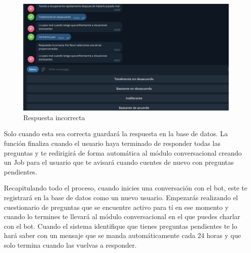 \begin{figure}[!ht]
    \centering
    \includegraphics[width=1\textwidth]{imagenes/pregunta_incorrecta.png}
    \caption{ Respuesta incorrecta }
    \label{fig:enter-label}
\end{figure}\vspace{0.3cm}

Solo cuando esta sea correcta guardará la respuesta en la base de datos. La función finaliza cuando el usuario haya terminado de responder todas las preguntas y te redirigirá de forma automática al módulo conversacional creando un Job para el usuario que te avisará cuando cuentes de nuevo con preguntas pendientes. \vspace{1cm}


Recapitulando todo el proceso, cuando inicies una conversación con el bot, este te registrará en la base de datos como un nuevo usuario. Empezarás realizando el cuestionario de preguntas que se encuentre activo para tí en ese momento y cuando lo termines te llevará al módulo conversacional en el que puedes charlar con el bot. Cuando el sistema identifique que tienes preguntas pendientes te lo hará saber con un mensaje que se manda automáticamente cada 24 horas y que solo termina cuando las vuelvas a responder.